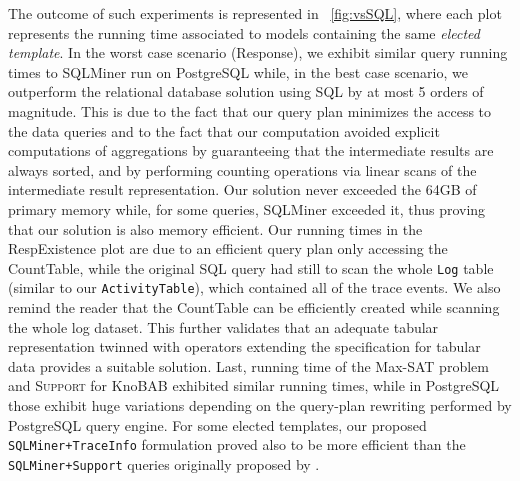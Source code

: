 The outcome of such experiments is represented in \figurename~\ref{fig:vsSQL}, where each plot represents the running time associated to models containing the same \textit{elected template}. In the worst case scenario (\textsf{Response}), we exhibit similar query running times to SQLMiner run on PostgreSQL while, in the best case scenario, we outperform the relational database solution using SQL by at most 5 orders of magnitude. This is due to the fact that our query plan minimizes the access to the data queries and to the fact that our computation avoided explicit computations of aggregations by guaranteeing that the intermediate results are always sorted, and by performing counting operations via linear scans of the intermediate result representation. Our solution never exceeded the 64GB of primary memory while, for some queries, SQLMiner exceeded it, thus proving that our solution is also memory efficient. Our running times in the \textsf{RespExistence} plot are due to an efficient query plan only accessing the  \textsf{CountTable}, while the original SQL query had still to scan the whole \texttt{Log} table (similar to our \texttt{ActivityTable}), which contained all of the trace events. We also remind the reader that the \textsf{CountTable} can be efficiently created while scanning the whole log dataset. This further validates that an adequate tabular representation twinned with \xLTLf operators extending the \LTLf specification for tabular data provides a suitable solution. Last, running time of the Max-SAT problem and \textsc{Support} for KnoBAB exhibited similar running times, while in PostgreSQL those exhibit huge variations depending on the query-plan rewriting performed by PostgreSQL query engine. For some elected templates, our proposed \texttt{SQLMiner+TraceInfo} formulation proved also to be more efficient than the \texttt{SQLMiner+Support} queries originally proposed by \cite{Schonig15}.




